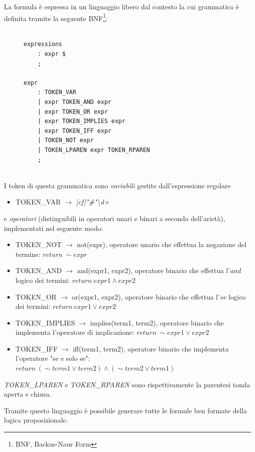 \documentclass[../main.tex]{subfiles}
\begin{document}
La formula è espressa in un linguaggio libero dal contesto la cui grammatica è definita tramite la seguente BNF\footnote{BNF, Backus-Naur Form}:
\begin{figure}[H]
\begin{lstlisting}

expressions
    : expr $ 
    ;

expr
    : TOKEN_VAR                       
    | expr TOKEN_AND expr             
    | expr TOKEN_OR expr              
    | expr TOKEN_IMPLIES expr         
    | expr TOKEN_IFF expr             
    | TOKEN_NOT expr 
    | TOKEN_LPAREN expr TOKEN_RPAREN  
    ;


\end{lstlisting}
\end{figure}

I token di questa grammatica sono \textit{variabili} gestite dall'espressione regolare
\begin{itemize}
    \item TOKEN\_VAR $\rightarrow$ \textit{[cf]"\#"\textbackslash d+}
\end{itemize}
e \textit{operatori} (distinguibili in operatori unari e binari a seconda dell'arietà), implementati nel seguente modo: 
\begin{itemize}
    \item TOKEN\_NOT $\rightarrow$ not(expr), operatore unario che effettua la negazione del termine: $return ~ \sim expr$ 
    \item TOKEN\_AND $\rightarrow$ and(expr1, expr2), operatore binario che effettua l'\textit{and} logico dei termini: $return ~ expr1 \wedge expr2$
    \item TOKEN\_OR $\rightarrow$ or(expr1, expr2), operatore binario che effettua l'\textit{or} logico dei termini: $return ~ expr1 \vee expr2$
    \item TOKEN\_IMPLIES $\rightarrow$ implies(term1, term2), operatore binario che implementa l'operatore di implicazione: $return ~ \sim expr1 \vee expr2$
    \item TOKEN\_IFF $\rightarrow$ iff(term1, term2), operatore binario che implementa l'operatore "se e solo se": $return ~ (\sim term1 \vee term2) \wedge (\sim term2 \vee term1)$
\end{itemize}
\textit{TOKEN\_LPAREN} e \textit{TOKEN\_RPAREN} sono rispettivamente la parentesi tonda aperta e chiusa.

Tramite questo linguaggio è possibile generare tutte le formule ben formate della logica proposizionale.
\end{document}
